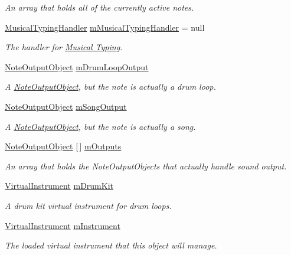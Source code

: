 \begin{DoxyCompactItemize}
\begin{DoxyCompactList}\small\item\em An array that holds all of the currently active notes. \end{DoxyCompactList}\item 
\hyperlink{class_musical_typing_handler}{Musical\+Typing\+Handler} \hyperlink{group___v_i_m_priv_gad7b95bd21383d11ea0cbf33d79b78e09}{m\+Musical\+Typing\+Handler} = null
\begin{DoxyCompactList}\small\item\em The handler for \hyperlink{class_musical_typing_handler}{Musical Typing}. \end{DoxyCompactList}\item 
\hyperlink{class_note_output_object}{Note\+Output\+Object} \hyperlink{group___v_i_m_priv_ga5f71cb71d240042312dcc13b481b068d}{m\+Drum\+Loop\+Output}
\begin{DoxyCompactList}\small\item\em A \hyperlink{class_note_output_object}{Note\+Output\+Object}, but the note is actually a drum loop. \end{DoxyCompactList}\item 
\hyperlink{class_note_output_object}{Note\+Output\+Object} \hyperlink{group___v_i_m_priv_gaa8d4f5642f5ac4dca4f4178b0052c78d}{m\+Song\+Output}
\begin{DoxyCompactList}\small\item\em A \hyperlink{class_note_output_object}{Note\+Output\+Object}, but the note is actually a song. \end{DoxyCompactList}\item 
\hyperlink{class_note_output_object}{Note\+Output\+Object} \mbox{[}$\,$\mbox{]} \hyperlink{group___v_i_m_priv_ga53f837fd01475fa35629a650e7fa00e3}{m\+Outputs}
\begin{DoxyCompactList}\small\item\em An array that holds the Note\+Output\+Objects that actually handle sound output. \end{DoxyCompactList}\item 
\hyperlink{class_virtual_instrument}{Virtual\+Instrument} \hyperlink{group___v_i_m_priv_ga0bc7c9f776b0d2dae0ccb1f1ee5f2143}{m\+Drum\+Kit}
\begin{DoxyCompactList}\small\item\em A drum kit virtual instrument for drum loops. \end{DoxyCompactList}\item 
\hyperlink{class_virtual_instrument}{Virtual\+Instrument} \hyperlink{group___v_i_m_priv_gaed435d1f9be09864846db4322dc21fd1}{m\+Instrument}
\begin{DoxyCompactList}\small\item\em The loaded virtual instrument that this object will manage. \end{DoxyCompactList}\end{DoxyCompactItemize}


